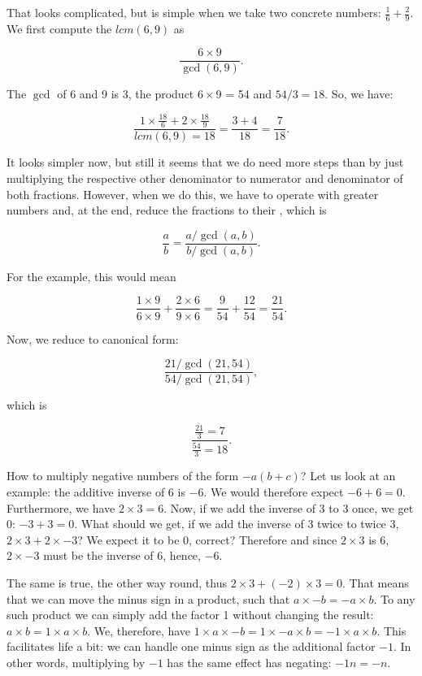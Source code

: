 \documentclass[tikz]{scrreprt}
\begin{document}
That looks complicated, but is simple
when we take two concrete numbers:
$\frac{1}{6} + \frac{2}{9}$.
We first compute the $lcm(6,9)$
as 

\[
\frac{6 \times 9}{\gcd(6,9)}.
\]

The $\gcd$ of 6 and 9 is 3,
the product $6 \times 9$ = 54
and $54 / 3 = 18$.
So, we have:

\[
\frac{1 \times \frac{18}{6} + 2 \times \frac{18}{9}}{lcm(6,9) = 18} =
\frac{3 + 4}{18} = \frac{7}{18}.
\]

It looks simpler now, but still it seems
that we do need more steps than by just
multiplying the respective other denominator
to numerator and denominator of both fractions.
However, when we do this, we have to operate
with greater numbers and, at the end, reduce
the fractions to their , which is

\begin{equation}
\frac{a}{b} = \frac{a/\gcd(a,b)}{b/\gcd(a,b)}.
\end{equation}

For the example, this would mean

\[
\frac{1 \times 9}{6 \times 9} + \frac{2 \times 6}{9 \times 6} =
\frac{9}{54} + \frac{12}{54} = \frac{21}{54}.
\]

Now, we reduce to canonical form:

\[
\frac{21/\gcd(21,54)}{54/\gcd(21,54)}, 
\]

which is 

\[
\frac{\frac{21}{3} = 7}{\frac{54}{3} = 18}. 
\]

How to multiply negative numbers of the form $-a(b + c)$?
Let us look at an example:
the additive inverse of 6 is $-6$.
We would therefore expect $-6 + 6 = 0$.
Furthermore, we have $2 \times 3 = 6$.
Now, if we add the inverse of 3 to 3 once,
we get 0:  
$-3 + 3 = 0$.
What should we get, if we add the
inverse of 3 twice to twice 3,
\ie\ $2 \times 3 + 2 \times -3$?
We expect it to be 0, correct?
Therefore and since $2 \times 3$ is 6,
$2 \times -3$ must be the inverse
of 6, hence, $-6$.

The same is true, the other way round,
thus $2 \times 3 + (-2) \times 3 = 0$.
That means that we can move the minus sign
in a product, such that $a \times -b = -a \times b$.
To any such product we can simply add the factor 1
without changing the result:
$a \times b = 1 \times a \times b$.
We, therefore, have
$1 \times a \times -b = 1 \times -a \times b = -1 \times a \times b$.
This facilitates life a bit: we can handle one minus sign
as the additional factor $-1$.
In other words, multiplying by $-1$ has the same effect
has negating: $-1n = -n$.
\end{document}

